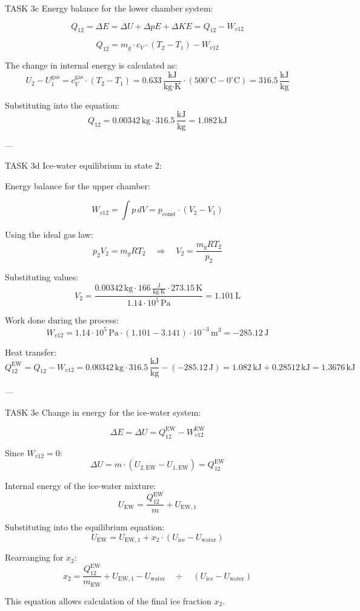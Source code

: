 TASK 3c  
Energy balance for the lower chamber system:  

\[
Q_{12} = \Delta E = \Delta U + \Delta pE + \Delta KE = Q_{12} - W_{v12}
\]

\[
Q_{12} = m_g \cdot c_V \cdot (T_2 - T_1) - W_{v12}
\]

The change in internal energy is calculated as:  
\[
U_{2} - U_{1}^{\text{gas}} = c_V^{\text{gas}} \cdot (T_2 - T_1) = 0.633 \, \frac{\text{kJ}}{\text{kg·K}} \cdot (500^\circ\text{C} - 0^\circ\text{C}) = 316.5 \, \frac{\text{kJ}}{\text{kg}}
\]

Substituting into the equation:  
\[
Q_{12} = 0.00342 \, \text{kg} \cdot 316.5 \, \frac{\text{kJ}}{\text{kg}} = 1.082 \, \text{kJ}
\]

---

TASK 3d  
Ice-water equilibrium in state 2:  

Energy balance for the upper chamber:  

\[
W_{v12} = \int p \, dV = p_{\text{const}} \cdot (V_2 - V_1)
\]

Using the ideal gas law:  
\[
p_2 V_2 = m_g R T_2 \quad \Rightarrow \quad V_2 = \frac{m_g R T_2}{p_2}
\]

Substituting values:  
\[
V_2 = \frac{0.00342 \, \text{kg} \cdot 166 \, \frac{\text{J}}{\text{kg·K}} \cdot 273.15 \, \text{K}}{1.14 \cdot 10^5 \, \text{Pa}} = 1.101 \, \text{L}
\]

Work done during the process:  
\[
W_{v12} = 1.14 \cdot 10^5 \, \text{Pa} \cdot (1.101 - 3.141) \cdot 10^{-3} \, \text{m}^3 = -285.12 \, \text{J}
\]

Heat transfer:  
\[
Q_{12}^{\text{EW}} = Q_{12} - W_{v12} = 0.00342 \, \text{kg} \cdot 316.5 \, \frac{\text{kJ}}{\text{kg}} - (-285.12 \, \text{J}) = 1.082 \, \text{kJ} + 0.28512 \, \text{kJ} = 1.3676 \, \text{kJ}
\]

---

TASK 3e  
Change in energy for the ice-water system:  

\[
\Delta E = \Delta U = Q_{12}^{\text{EW}} - W_{v12}^{\text{EW}}
\]

Since \( W_{v12} = 0 \):  
\[
\Delta U = m \cdot (U_{2,\text{EW}} - U_{1,\text{EW}}) = Q_{12}^{\text{EW}}
\]

Internal energy of the ice-water mixture:  
\[
U_{\text{EW}} = \frac{Q_{12}^{\text{EW}}}{m} + U_{\text{EW},1}
\]

Substituting into the equilibrium equation:  
\[
U_{\text{EW}} = U_{\text{EW},1} + x_2 \cdot (U_{\text{ice}} - U_{\text{water}})
\]

Rearranging for \( x_2 \):  
\[
x_2 = \frac{Q_{12}^{\text{EW}}}{m_{\text{EW}}} + U_{\text{EW},1} - U_{\text{water}} \quad \div \quad (U_{\text{ice}} - U_{\text{water}})
\]  

This equation allows calculation of the final ice fraction \( x_2 \).